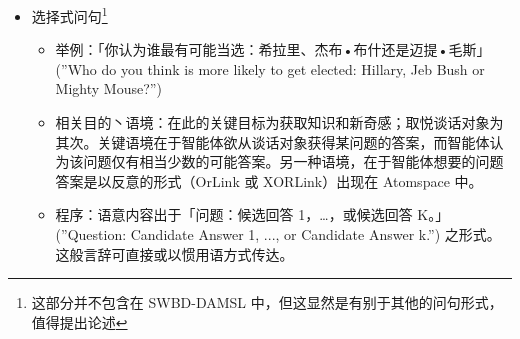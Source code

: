 \begin{itemize}
\item 选择式问句\footnote{这部分并不包含在 SWBD-DAMSL 中，但这显然是有别于其他的问句形式，值得提出论述}
\begin{itemize}
\item 举例：「你认为谁最有可能当选：希拉里、杰布•布什还是迈提•毛斯」(”Who do you think is more likely to get elected: Hillary, Jeb Bush or Mighty Mouse?”)
\item 相关目的丶语境：在此的关键目标为获取知识和新奇感；取悦谈话对象为其次。关键语境在于智能体欲从谈话对象获得某问题的答案，而智能体认为该问题仅有相当少数的可能答案。另一种语境，在于智能体想要的问题答案是以反意的形式（OrLink 或 XORLink）出现在 Atomspace 中。
\item 程序：语意内容出于「问题：候选回答 1，…，或候选回答 K。」(”Question: Candidate Answer 1, ..., or Candidate Answer k.”) 之形式。这般言辞可直接或以惯用语方式传达。
\end{itemize}


\end{itemize}

